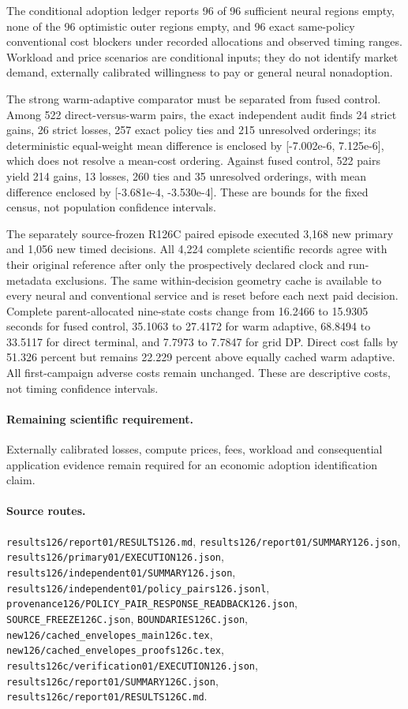 The conditional adoption ledger reports 96 of 96 sufficient neural regions empty, none of the 96 optimistic outer regions empty, and 96 exact same-policy conventional cost blockers under recorded allocations and observed timing ranges. Workload and price scenarios are conditional inputs; they do not identify market demand, externally calibrated willingness to pay or general neural nonadoption.\par
The strong warm-adaptive comparator must be separated from fused control. Among 522 direct-versus-warm pairs, the exact independent audit finds 24 strict gains, 26 strict losses, 257 exact policy ties and 215 unresolved orderings; its deterministic equal-weight mean difference is enclosed by [-7.002e-6, 7.125e-6], which does not resolve a mean-cost ordering. Against fused control, 522 pairs yield 214 gains, 13 losses, 260 ties and 35 unresolved orderings, with mean difference enclosed by [-3.681e-4, -3.530e-4]. These are bounds for the fixed census, not population confidence intervals.\par
The separately source-frozen R126C paired episode executed 3,168 new primary and 1,056 new timed decisions. All 4,224 complete scientific records agree with their original reference after only the prospectively declared clock and run-metadata exclusions. The same within-decision geometry cache is available to every neural and conventional service and is reset before each next paid decision. Complete parent-allocated nine-state costs change from 16.2466 to 15.9305 seconds for fused control, 35.1063 to 27.4172 for warm adaptive, 68.8494 to 33.5117 for direct terminal, and 7.7973 to 7.7847 for grid DP. Direct cost falls by 51.326 percent but remains 22.229 percent above equally cached warm adaptive. All first-campaign adverse costs remain unchanged. These are descriptive costs, not timing confidence intervals.\par

\paragraph{Remaining scientific requirement.} Externally calibrated losses, compute prices, fees, workload and consequential application evidence remain required for an economic adoption identification claim.

\paragraph{Source routes.} \nolinkurl{results126/report01/RESULTS126.md}, \nolinkurl{results126/report01/SUMMARY126.json}, \nolinkurl{results126/primary01/EXECUTION126.json}, \nolinkurl{results126/independent01/SUMMARY126.json}, \nolinkurl{results126/independent01/policy_pairs126.jsonl}, \nolinkurl{provenance126/POLICY_PAIR_RESPONSE_READBACK126.json}, \nolinkurl{SOURCE_FREEZE126C.json}, \nolinkurl{BOUNDARIES126C.json}, \nolinkurl{new126/cached_envelopes_main126c.tex}, \nolinkurl{new126/cached_envelopes_proofs126c.tex}, \nolinkurl{results126c/verification01/EXECUTION126.json}, \nolinkurl{results126c/report01/SUMMARY126C.json}, \nolinkurl{results126c/report01/RESULTS126C.md}.

